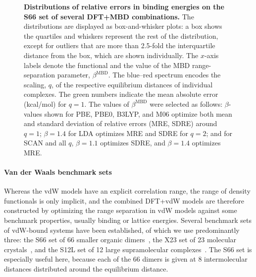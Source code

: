 \begin{figure}[t!]
\caption{\textbf{Distributions of relative errors in binding energies on the S66 set of several DFT+MBD combinations.}
The distributions are displayed as box-and-whisker plots: a box shows the quartiles and whiskers represent the rest of the distribution, except for outliers that are more than 2.5-fold the interquartile distance from the box, which are shown individually.
The $x$-axis labels denote the functional and the value of the MBD range-separation parameter, $\beta^\text{MBD}$.
The blue--red spectrum encodes the scaling, $q$, of the respective equilibrium distances of individual complexes.
The green numbers indicate the mean absolute error (kcal/mol) for $q=1$.
The values of $\beta^\text{MBD}$ were selected as follows: $\beta$-values shown for PBE, PBE0, B3LYP, and M06 optimize both mean and standard deviation of relative errors (MRE, SDRE) around $q=1$; $\beta=1.4$ for LDA optimizes MRE and SDRE for $q=2$; and for SCAN and all $q$, $\beta=1.1$ optimizes SDRE, and $\beta=1.4$ optimizes MRE\@.
}\label{fig:s66-dists}
\end{figure}

\paragraph{Van der Waals benchmark sets}

Whereas the vdW models have an explicit correlation range, the range of density functionals is only implicit, and the combined DFT+vdW models are therefore constructed by optimizing the range separation in vdW models against some benchmark properties, usually binding or lattice energies.
Several benchmark sets of vdW-bound systems have been established, of which we use predominantly three: the S66 set of 66 smaller organic dimers~\cite{RezacJCTC11}, the X23 set of 23 molecular crystals~\cite{ReillyJCP13}, and the S12L set of 12 large supramolecular complexes~\cite{RisthausJCTC13,AmbrosettiJPCL14}.
The S66 set is especially useful here, because each of the 66 dimers is given at 8 intermolecular distances distributed around the equilibrium distance.

